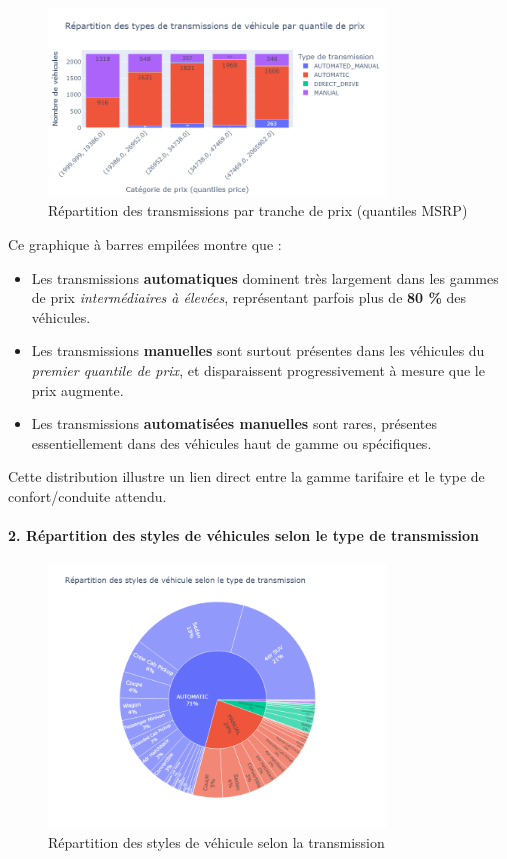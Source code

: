 \documentclass[12pt]{report}
\begin{document}
\begin{figure}[H]
\centering
\includegraphics[width=0.8\textwidth]{transmission_vs_price.png}
\caption{Répartition des transmissions par tranche de prix (quantiles MSRP)}
\end{figure}


Ce graphique à barres empilées montre que :
\begin{itemize}
  \item Les transmissions \textbf{automatiques} dominent très largement dans les gammes de prix \textit{intermédiaires à élevées}, représentant parfois plus de \textbf{80 \%} des véhicules.
  \item Les transmissions \textbf{manuelles} sont surtout présentes dans les véhicules du \textit{premier quantile de prix}, et disparaissent progressivement à mesure que le prix augmente.
  \item Les transmissions \textbf{automatisées manuelles} sont rares, présentes essentiellement dans des véhicules haut de gamme ou spécifiques.
\end{itemize}

Cette distribution illustre un lien direct entre la gamme tarifaire et le type de confort/conduite attendu.

\paragraph{2. Répartition des styles de véhicules selon le type de transmission}\mbox{}

\begin{figure}[H]
\centering
\includegraphics[width=0.8\textwidth]{transmission_style_sunburst.png}
\caption{Répartition des styles de véhicule selon la transmission}
\end{figure}
\end{document}
